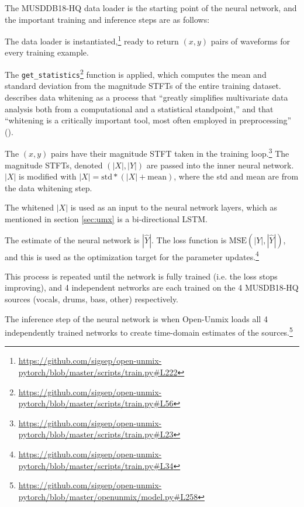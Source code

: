 \documentclass[report.tex]{subfiles}
\begin{document}
The MUSDDB18-HQ data loader is the starting point of the neural network, and the important training and inference steps are as follows:

\begin{tight_enumerate}
	\item
		The data loader is instantiated,\footnote{\url{https://github.com/sigsep/open-unmix-pytorch/blob/master/scripts/train.py\#L222}} ready to return $(x, y)$ pairs of waveforms for every training example.
	\item
		The \Verb#get_statistics#\footnote{\url{https://github.com/sigsep/open-unmix-pytorch/blob/master/scripts/train.py\#L56}} function is applied, which computes the mean and standard deviation from the magnitude STFTs of the entire training dataset. \citeauthor{Kessy_2018} describes data whitening as a process that ``greatly simplifies multivariate data analysis both from a computational and a statistical standpoint,'' and that ``whitening is a critically important tool, most often employed in preprocessing'' (\cite[309]{Kessy_2018}).
	\item
		The $(x, y)$ pairs have their magnitude STFT taken in the training loop.\footnote{\url{https://github.com/sigsep/open-unmix-pytorch/blob/master/scripts/train.py\#L23}} The magnitude STFTs, denoted $(|X|, |Y|)$ are passed into the inner neural network. $|X|$ is modified with $|X| = \text{std}*(|X|+\text{mean})$, where the std and mean are from the data whitening step.
	\item
		The whitened $|X|$ is used as an input to the neural network layers, which as mentioned in section \ref{sec:umx} is a bi-directional LSTM.
	\item
		The estimate of the neural network is $|\hat{Y}|$. The loss function is $\text{MSE}(|Y|, |\hat{Y}|)$, and this is used as the optimization target for the parameter updates.\footnote{\url{https://github.com/sigsep/open-unmix-pytorch/blob/master/scripts/train.py\#L34}}
	\item
		This process is repeated until the network is fully trained (i.e. the loss stops improving), and 4 independent networks are each trained on the 4 MUSDB18-HQ sources (vocals, drums, bass, other) respectively.
	\item
		The inference step of the neural network is when Open-Unmix loads all 4 independently trained networks to create time-domain estimates of the sources.\footnote{\url{https://github.com/sigsep/open-unmix-pytorch/blob/master/openunmix/model.py\#L258}}
	\item

\end{tight_enumerate}
\end{document}
